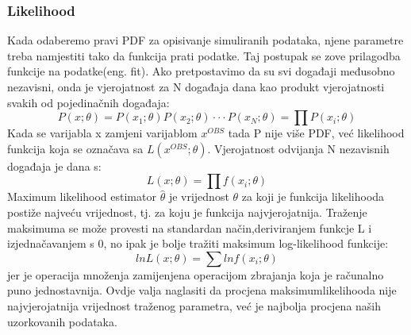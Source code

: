 \documentclass[12pt,a4paper,oneside]{article}
\begin{document}
\begin{linenumbers}
		\subsubsection{Likelihood}
		Kada odaberemo pravi PDF za opisivanje simuliranih podataka, njene parametre treba namjestiti tako da funkcija prati podatke. Taj postupak se zove prilagodba funkcije na podatke(eng. fit). Ako pretpostavimo da su svi događaji međusobno nezavisni, onda je vjerojatnost za N događaja dana kao produkt vjerojatnosti svakih od pojedinačnih događaja:
		\begin{equation}
		P(x;\theta) = P(x_1 ; \theta) P(x_2 ; \theta) \cdot \cdot \cdot P(x_N ; \theta) = \prod P(x_i ; \theta)
		\end{equation}
		Kada se varijabla x zamjeni varijablom \begin{math}
		x^{OBS}
		\end{math} tada P nije više PDF, već likelihood funkcija  koja se označava sa \begin{math}
		L (x^{OBS}; \theta)
		\end{math}. Vjerojatnost odvijanja N nezavisnih događaja je dana s:
		\begin{equation}
		L(x; \theta) = \prod f(x_i; \theta)
		\end{equation}
		Maximum likelihood estimator \begin{math}
		\hat{\theta}
		\end{math} je vrijednost $\theta$ za koji je funkcija likelihooda postiže najveću vrijednost, tj. za koju je funkcija najvjerojatnija. Traženje maksimuma se može provesti na standardan način,deriviranjem funkcje L i izjednačavanjem s 0, no ipak je bolje tražiti maksimum log-likelihood funkcije:
		\begin{equation}
		ln L(x; \theta) = \sum ln f(x_i; \theta)
		\end{equation}
		jer je operacija množenja zamijenjena operacijom zbrajanja koja je računalno puno jednostavnija.
		Ovdje valja naglasiti da procjena maksimumlikelihooda nije najvjerojatnija vrijednost traženog parametra, već je najbolja procjena naših uzorkovanih podataka.
		

\end{linenumbers}
\end{document}
